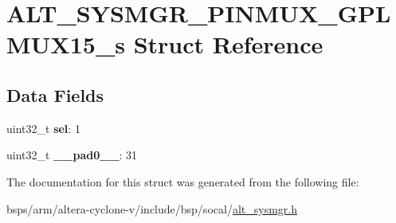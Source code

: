 \hypertarget{structALT__SYSMGR__PINMUX__GPLMUX15__s}{}\section{A\+L\+T\+\_\+\+S\+Y\+S\+M\+G\+R\+\_\+\+P\+I\+N\+M\+U\+X\+\_\+\+G\+P\+L\+M\+U\+X15\+\_\+s Struct Reference}
\label{structALT__SYSMGR__PINMUX__GPLMUX15__s}
\subsection*{Data Fields}
\begin{DoxyCompactItemize}
\item 
\mbox{\label{structALT__SYSMGR__PINMUX__GPLMUX15__s_aaa14724449a801be3d6e17140bea6c7e}} 
uint32\+\_\+t {\bfseries sel}\+: 1
\item 
\mbox{\label{structALT__SYSMGR__PINMUX__GPLMUX15__s_a5b45c8cad680427b49a3f378c5c34076}} 
uint32\+\_\+t {\bfseries \+\_\+\+\_\+pad0\+\_\+\+\_\+}\+: 31
\end{DoxyCompactItemize}


The documentation for this struct was generated from the following file\+:\begin{DoxyCompactItemize}
\item 
bsps/arm/altera-\/cyclone-\/v/include/bsp/socal/\mbox{\hyperlink{alt__sysmgr_8h}{alt\+\_\+sysmgr.\+h}}\end{DoxyCompactItemize}
